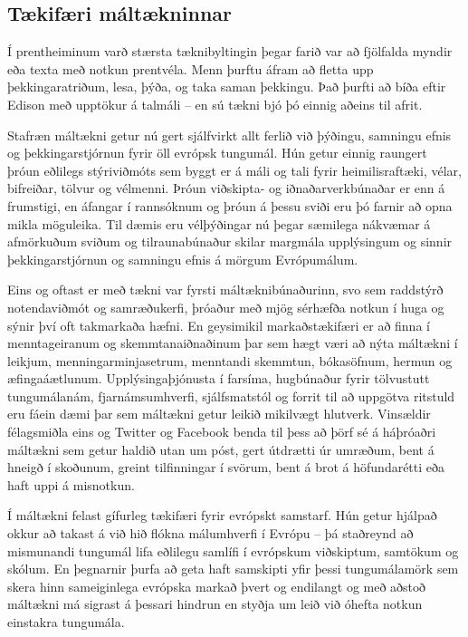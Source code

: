 \documentclass{../../metanetpaper}
\begin{document}
\begin{multicols}{2}
\subsection{Tækifæri máltækninnar}

Í prentheiminum varð stærsta tæknibyltingin þegar farið var að fjölfalda myndir eða texta með notkun prentvéla. Menn þurftu áfram að fletta upp þekkingaratriðum, lesa, þýða, og taka saman þekkingu. Það þurfti að bíða eftir Edison með upptökur á talmáli -- en sú tækni bjó þó einnig aðeins til afrit.

Stafræn máltækni getur nú gert sjálfvirkt allt ferlið við þýðingu, samningu efnis og þekkingarstjórnun fyrir öll evrópsk tungumál. Hún getur einnig raungert þróun eðlilegs stýriviðmóts sem byggt er á máli og tali fyrir heimilisraftæki, vélar, bifreiðar, tölvur og vélmenni. Þróun viðskipta- og iðnaðarverkbúnaðar er enn á frumstigi, en áfangar í rannsóknum og þróun á þessu sviði eru þó farnir að opna mikla möguleika. Til dæmis eru vélþýðingar nú þegar sæmilega nákvæmar á afmörkuðum sviðum og tilraunabúnaður skilar margmála upplýsingum og sinnir þekkingarstjórnun og samningu efnis á mörgum Evrópumálum.

Eins og oftast er með tækni var fyrsti máltæknibúnaðurinn, svo sem raddstýrð notendaviðmót og samræðukerfi, þróaður með mjög sérhæfða notkun í huga og sýnir því oft takmarkaða hæfni. En geysimikil markaðstækifæri er að finna í menntageiranum og skemmtanaiðnaðinum þar sem hægt væri að nýta máltækni í leikjum, menningarminjasetrum, menntandi skemmtun, bókasöfnum, hermun og æfingaáætlunum. Upplýsingaþjónusta í farsíma, hugbúnaður fyrir tölvustutt tungumálanám, fjarnámsumhverfi, sjálfsmatstól og forrit til að uppgötva ritstuld eru fáein dæmi þar sem máltækni getur leikið mikilvægt hlutverk. Vinsældir félagsmiðla eins og Twitter og Facebook benda til þess að þörf sé á háþróaðri máltækni sem getur haldið utan um póst, gert útdrætti úr umræðum, bent á hneigð í skoðunum, greint tilfinningar í svörum, bent á brot á höfundarétti eða haft uppi á misnotkun.

Í máltækni felast gífurleg tækifæri fyrir evrópskt samstarf. Hún getur hjálpað okkur að takast á við hið flókna málumhverfi í Evrópu -- þá staðreynd að mismunandi tungumál lifa eðlilegu samlífi í evrópskum viðskiptum, samtökum og skólum. En þegnarnir þurfa að geta haft samskipti yfir þessi tungumálamörk sem skera hinn sameiginlega evrópska markað þvert og endilangt og með aðstoð máltækni má sigrast á þessari hindrun en styðja um leið við óhefta notkun einstakra tungumála. 


\end{multicols}
\end{document}
